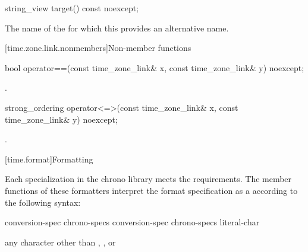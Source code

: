 %
\begin{itemdecl}
string_view target() const noexcept;
\end{itemdecl}

\begin{itemdescr}
\pnum
\returns
The name of the  for which
this  provides an alternative name.
\end{itemdescr}

[time.zone.link.nonmembers]{Non-member functions}

%
\begin{itemdecl}
bool operator==(const time_zone_link& x, const time_zone_link& y) noexcept;
\end{itemdecl}

\begin{itemdescr}
\pnum
\returns
{}.
\end{itemdescr}

%
\begin{itemdecl}
strong_ordering operator<=>(const time_zone_link& x, const time_zone_link& y) noexcept;
\end{itemdecl}

\begin{itemdescr}
\pnum
\returns
{}.
\end{itemdescr}

[time.format]{Formatting}
%

\pnum
Each  specialization
in the chrono library
meets the  requirements.
The  member functions of these formatters
interpret the format specification
as a 
according to the following syntax:
\begin{ncbnf}
\br
       
\end{ncbnf}

\begin{ncbnf}
\br
    conversion-spec\br
    chrono-specs conversion-spec\br
    chrono-specs literal-char
\end{ncbnf}

\begin{ncbnf}
\br
    \textnormal{any character other than \noncxxtcode{\{}, \noncxxtcode{\}}, or \noncxxtcode{\%}}
\end{ncbnf}

